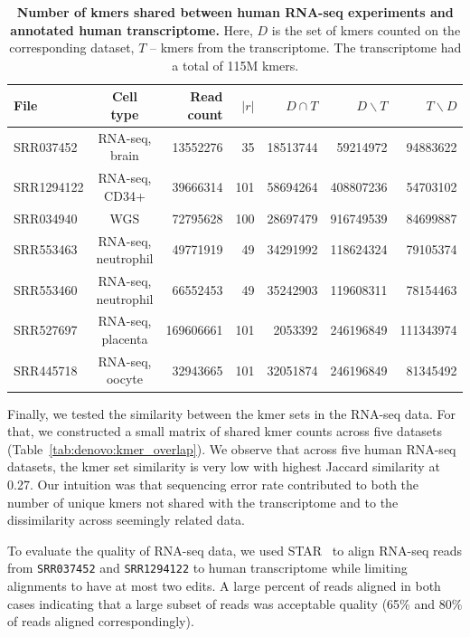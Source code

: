 \documentclass[12pt]{cmuthesis}
\begin{document}
    \begin{table}
      \centering
      \begin{tabular}{l c r r r r r}
          \toprule
          File  & Cell type & Read count & $|r|$ & $D \cap T$ & $D \backslash T$ & $T \backslash D$ \\
          \midrule
          SRR037452 & RNA-seq, brain & 13552276 & 35 & 18513744 & 59214972 & 94883622 \\
          SRR1294122  & RNA-seq, CD34+ & 39666314 & 101 & 58694264 & 408807236 & 54703102 \\
          SRR034940 & WGS & 72795628 & 100 & 28697479 & 916749539 & 84699887 \\
          SRR553463 & RNA-seq, neutrophil & 49771919 & 49 & 34291992 & 118624324 & 79105374 \\
          SRR553460 & RNA-seq, neutrophil & 66552453 & 49 & 35242903 & 119608311 & 78154463 \\
          SRR527697 & RNA-seq, placenta & 169606661 & 101 & 2053392 & 246196849 & 111343974 \\
          SRR445718 & RNA-seq, oocyte & 32943665& 101 & 32051874 & 246196849 & 81345492 \\
          \bottomrule
      \end{tabular}
      \caption{\textbf{Number of kmers shared between human RNA-seq experiments and annotated human transcriptome.} Here, $D$ is the set of kmers counted on the corresponding dataset, $T$ -- kmers from the transcriptome. The transcriptome had a total of 115M kmers.}
      \label{tab:denovo:transciptome_overlap}
    \end{table}

    Finally, we tested the similarity between the kmer sets in the RNA-seq data. For that, we constructed a small matrix of shared kmer counts across five datasets (Table~\ref{tab:denovo:kmer_overlap}). We observe that across five human RNA-seq datasets, the kmer set similarity is very low with highest Jaccard similarity at 0.27. Our intuition was that sequencing error rate contributed to both the number of unique kmers not shared with the transcriptome and to the dissimilarity across seemingly related data. 


    To evaluate the quality of RNA-seq data, we used STAR~\cite{DobinSTAR} to align RNA-seq reads from \texttt{SRR037452} and \texttt{SRR1294122} to human transcriptome while limiting alignments to have at most two edits. A large percent of reads aligned in both cases indicating that a large subset of reads was acceptable quality (65\% and 80\% of reads aligned correspondingly).
\end{document}
